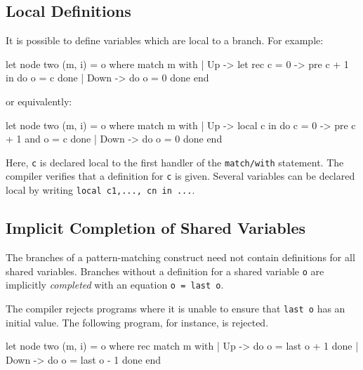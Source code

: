 \documentclass[11pt,titlepage,twoside]{report}
\makeatletter
\newcommand{\zls}[1]{{\@span{class="zelusinline"}#1}}
\newcommand{\zls}[1]{\texttt{#1}}
\renewcommand{\zls}[1]{\texttt{#1}}
\makeatother
\begin{document}
\subsection{Local Definitions\label{localdef}} %

It is possible to define variables which are local to a branch. For
example:
\begin{chklisting}[include=updownmodes]
let node two (m, i) = o where
  match m with
  | Up -> let rec c = 0 -> pre c + 1 in
          do o = c done
  | Down -> do o = 0 done
  end
\end{chklisting}
or equivalently:
\begin{chklisting}[include=updownmodes]
let node two (m, i) = o where
  match m with
  | Up -> local c in
          do c = 0 -> pre c + 1
          and o = c done
  | Down -> do o = 0 done
  end
\end{chklisting}
Here, \zls{c} is declared local to the first handler of the \zls{match/with} 
statement.
The compiler verifies that a definition for \zls{c} is given.
Several variables can be declared local by writing
\zls{local c1,..., cn in ...}.

\subsection{Implicit Completion of Shared Variables\label{completeshared}} %

The branches of a pattern-matching construct need not contain definitions 
for all shared variables.
Branches without a definition for a shared variable \zls{o} are implicitly 
\emph{completed} with an equation \zls{o = last o}.

The compiler rejects programs where it is unable to ensure that \zls{last o} 
has an initial value.
The following program, for instance, is rejected.
\begin{chklisting}[withresult,fail,include=updownmodes]
let node two (m, i) = o where
  rec match m with
      | Up -> do o = last o + 1 done
      | Down -> do o = last o - 1 done
      end
\end{chklisting}


\end{document}
